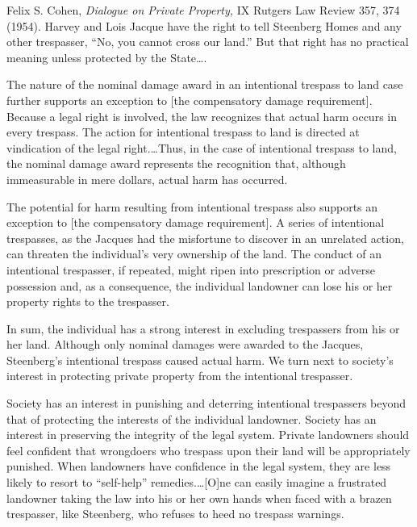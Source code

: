Felix S. Cohen, \textit{Dialogue on Private Property,} IX Rutgers Law Review
357, 374 (1954). Harvey and Lois Jacque have the right to tell Steenberg Homes
and any other trespasser, ``No, you cannot cross our land.'' But that right has
no practical meaning unless protected by the State\ldots.

The nature of the nominal damage award in an intentional trespass to land case
further supports an exception to [the compensatory damage
requirement]. Because a legal right is involved, the law recognizes
that actual harm occurs in every trespass. The action for intentional trespass
to land is directed at vindication of the legal right.\ldots Thus, in the
case of intentional trespass to land, the nominal damage award represents the
recognition that, although immeasurable in mere dollars, actual harm has
occurred.

The potential for harm resulting from intentional trespass also supports an
exception to [the compensatory damage requirement]. A series of
intentional trespasses, as the Jacques had the misfortune to discover in an
unrelated action, can threaten the individual's very ownership of the land. The
conduct of an intentional trespasser, if repeated, might ripen into
prescription or adverse possession and, as a consequence, the individual
landowner can lose his or her property rights to the trespasser. 

In sum, the individual has a strong interest in excluding trespassers from his
or her land. Although only nominal damages were awarded to the Jacques,
Steenberg's intentional trespass caused actual harm. We turn next to society's
interest in protecting private property from the intentional trespasser.

 Society has an interest in punishing and deterring intentional trespassers
beyond that of protecting the interests of the individual landowner. Society
has an interest in preserving the integrity of the legal system. Private
landowners should feel confident that wrongdoers who trespass upon their land
will be appropriately punished. When landowners have confidence in the legal
system, they are less likely to resort to ``self-help'' remedies.\ldots [O]ne
can easily imagine a frustrated landowner taking the law into his or her own
hands when faced with a brazen trespasser, like Steenberg, who refuses to heed
no trespass warnings.

